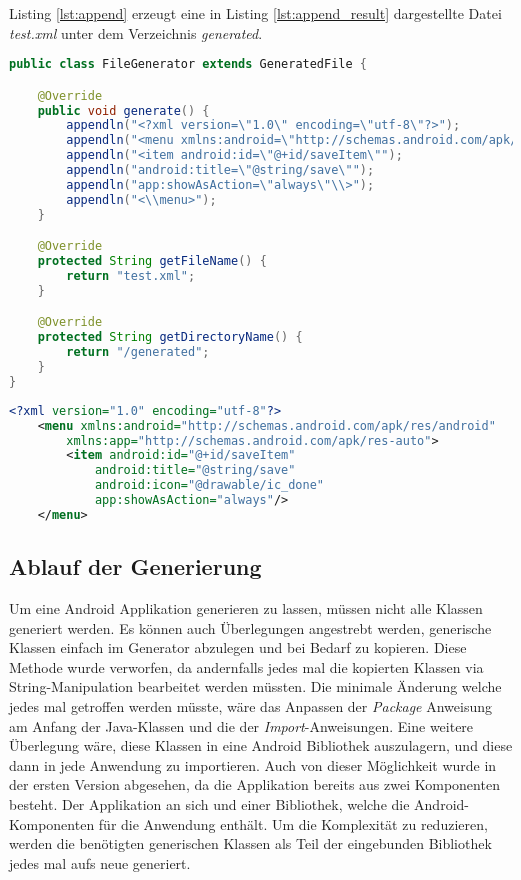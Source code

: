 Listing \ref{lst:append} erzeugt eine in Listing \ref{lst:append_result} dargestellte Datei \textit{test.xml} unter dem Verzeichnis \textit{generated}.
\begin{lstlisting}[label=lst:append,
language=java,
firstnumber=1,
caption=Beispiel eine \textit{GeneratedFile}-Instanz zur Erzeugung einer \textit{XML}-Datei.]				   
public class FileGenerator extends GeneratedFile {

	@Override
	public void generate() {
		appendln("<?xml version=\"1.0\" encoding=\"utf-8\"?>");
		appendln("<menu xmlns:android=\"http://schemas.android.com/apk/res/android\" xmlns:app=\"http://schemas.android.com/apk/res-auto\">");
		appendln("<item android:id=\"@+id/saveItem\"");
		appendln("android:title=\"@string/save\"");
		appendln("app:showAsAction=\"always\"\\>");
		appendln("<\\menu>");
	}

	@Override
	protected String getFileName() {
		return "test.xml";
	}

	@Override
	protected String getDirectoryName() {
		return "/generated";
	}
}
\end{lstlisting}

\newpage

\begin{lstlisting}[label=lst:append_result,
language=xml,
firstnumber=1,
caption=Erzeugte \textit{XML}-Datei durch den Quellcode von Listing \ref{lst:append}.]				   
<?xml version="1.0" encoding="utf-8"?>
	<menu xmlns:android="http://schemas.android.com/apk/res/android"
		xmlns:app="http://schemas.android.com/apk/res-auto">
		<item android:id="@+id/saveItem"
			android:title="@string/save"
			android:icon="@drawable/ic_done"
			app:showAsAction="always"/>
	</menu>
\end{lstlisting}

\subsection{Ablauf der Generierung}
Um eine Android Applikation generieren zu lassen, müssen nicht alle Klassen generiert werden. Es können auch Überlegungen angestrebt werden, generische Klassen einfach im Generator abzulegen und bei Bedarf zu kopieren. Diese Methode wurde verworfen, da andernfalls jedes mal die kopierten Klassen via String-Manipulation bearbeitet werden müssten. Die minimale Änderung welche jedes mal getroffen werden müsste, wäre das Anpassen der \textit{Package} Anweisung am Anfang der Java-Klassen und die der \textit{Import}-Anweisungen. Eine weitere Überlegung wäre, diese Klassen in eine Android Bibliothek auszulagern, und diese dann in jede Anwendung zu importieren. Auch von dieser Möglichkeit wurde in der ersten Version abgesehen, da die Applikation bereits aus zwei Komponenten besteht. Der Applikation an sich und einer Bibliothek, welche die Android-Komponenten für die Anwendung enthält. Um die Komplexität zu reduzieren, werden die benötigten generischen Klassen als Teil der eingebunden Bibliothek jedes mal aufs neue generiert.

